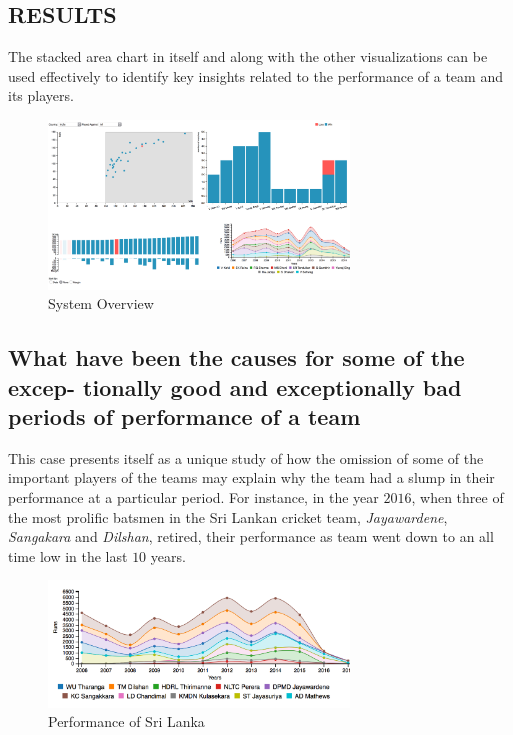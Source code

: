 \documentclass[letterpaper,10pt]{article}
\begin{document}
\begin{multicols}{2}
\section{RESULTS}
The stacked area chart in itself and along with the other visualizations can be used effectively to identify key insights related to the performance of a team and its players.
\begin{figure}[H]
\begin{center}
{\includegraphics[width = 8cm]{case4.png}
\caption{System Overview}
}
\end{center}
\end{figure}

\subsection{What have been the causes for some of the excep- tionally good and exceptionally bad periods of performance of a team}
This case presents itself as a unique study of how the omission of some of the important players of the teams may explain why the team had a slump in their performance at a particular period. For instance, in the year $2016$, when three of the most prolific batsmen in the Sri Lankan cricket team, \textit{Jayawardene}, \textit{Sangakara} and \textit{Dilshan}, retired, their performance as team went down to an all time low in the last $10$ years.
\begin{figure}[H]
\begin{center}
{\includegraphics[width = 8cm]{sri_lanka_case.png}
\caption{Performance of Sri Lanka}
}
\end{center}
\end{figure}


\end{multicols}
\end{document}
